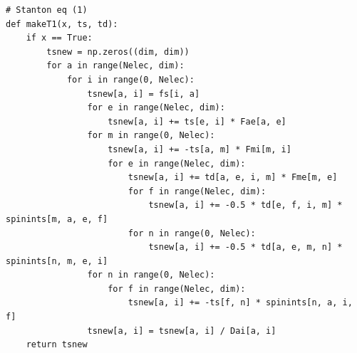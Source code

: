 \begin{lstlisting}[style=MyPython]
# Stanton eq (1)
def makeT1(x, ts, td):
    if x == True:
        tsnew = np.zeros((dim, dim))
        for a in range(Nelec, dim):
            for i in range(0, Nelec):
                tsnew[a, i] = fs[i, a]
                for e in range(Nelec, dim):
                    tsnew[a, i] += ts[e, i] * Fae[a, e]
                for m in range(0, Nelec):
                    tsnew[a, i] += -ts[a, m] * Fmi[m, i]
                    for e in range(Nelec, dim):
                        tsnew[a, i] += td[a, e, i, m] * Fme[m, e]
                        for f in range(Nelec, dim):
                            tsnew[a, i] += -0.5 * td[e, f, i, m] * spinints[m, a, e, f]
                        for n in range(0, Nelec):
                            tsnew[a, i] += -0.5 * td[a, e, m, n] * spinints[n, m, e, i]
                for n in range(0, Nelec):
                    for f in range(Nelec, dim):
                        tsnew[a, i] += -ts[f, n] * spinints[n, a, i, f]
                tsnew[a, i] = tsnew[a, i] / Dai[a, i]
    return tsnew



\end{lstlisting}
